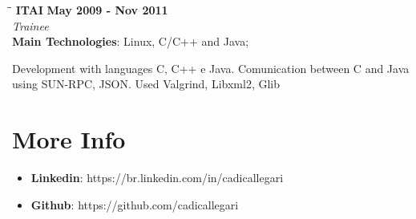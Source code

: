 \documentclass[margin]{res}
\begin{document}
\begin{resume}
   \begin{tabbing}
   \hspace{2.3in}\= \hspace{1.5in}\= \kill %
    \textbf{ITAI}    \>\>\textbf{May 2009 - Nov 2011}\\
    \textit{Trainee}\\
    \textbf{Main Technologies}: Linux, C/C++ and Java;
   \end{tabbing}\vspace{-20pt}      %
    \vspace{2mm}
       Development with languages C, C++ e Java. Comunication between C and Java using SUN-RPC, JSON. Used Valgrind, Libxml2, Glib


\section{More Info}
    \begin{itemize}
        \item \textbf{Linkedin}: https://br.linkedin.com/in/cadicallegari
         \item \textbf{Github}: https://github.com/cadicallegari
    \end{itemize}


\end{resume}
\end{document}
